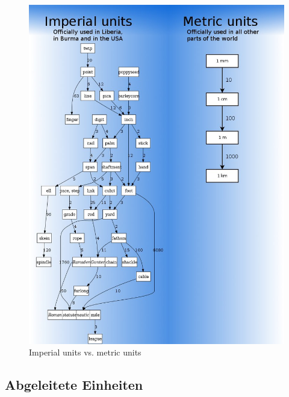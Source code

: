\begin{frame}
  \begin{center}
    \begin{figure}
      \includegraphics[height=.9\textheight]{e01/imperial_vs_metric.jpeg}
      \caption{Imperial units vs. metric units \cite{si_ausflug}}
      \label{fig_si_ausflug}
    \end{figure}
  \end{center}

\end{frame}

\subsection{Abgeleitete Einheiten}

